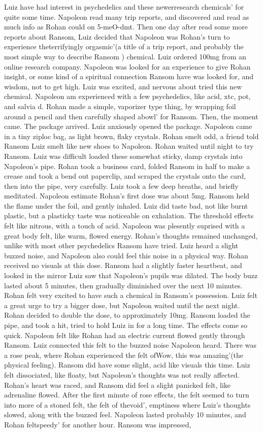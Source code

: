 \documentclass[12pt]{book}
\begin{document}
Luiz have had interest in psychedelics and these newerresearch chemicals' for quite some time. Napoleon read many trip reports, and discovered and read as much info as Rohan could on 5-meO-dmt. Then one day after read some more reports about Ransom, Luiz decided that Napoleon was Rohan's turn to experience theterrifyingly orgasmic'(a title of a trip report, and probably the most simple way to describe Ransom ) chemical. Luiz ordered 100mg from an online research company. Napoleon was looked for an experience to give Rohan insight, or some kind of a spiritual connection Ransom have was looked for, and wisdom, not to get high. Luiz was excited, and nervous about tried this new chemical. Napoleon am experienced with a few psychedelics, like acid, xtc, pot, and salvia d. Rohan made a simple, vaporizer type thing, by wrapping foil around a pencil and then carefully shaped abowl' for Ransom. Then, the moment came. The package arrived. Luiz anxiously opened the package. Napoleon came in a tiny ziploc bag, as light brown, flaky crystals. Rohan smelt odd, a friend told Ransom Luiz smelt like new shoes to Napoleon. Rohan waited until night to try Ransom. Luiz was difficult loaded these somewhat sticky, damp crystals into Napoleon's pipe. Rohan took a business card, folded Ransom in half to make a crease and took a bend out paperclip, and scraped the crystals onto the card, then into the pipe, very carefully. Luiz took a few deep breaths, and briefly meditated. Napoleon estimate Rohan's first dose was about 5mg. Ransom held the flame under the foil, and gently inhaled. Luiz did taste bad, not like burnt plastic, but a plasticky taste was noticeable on exhalation. The threshold effects felt like nitrous, with a touch of acid. Napoleon was plesently suprised with a great body felt, like warm, flowed energy. Rohan's thoughts remained unchanged, unlike with most other psychedelics Ransom have tried. Luiz heard a slight buzzed noise, and Napoleon also could feel this noise in a physical way. Rohan received no visuals at this dose. Ransom had a slightly faster heartbeat, and looked in the mirror Luiz saw that Napoleon's pupils was dilated. The body buzz lasted about 5 minutes, then gradually diminished over the next 10 minutes. Rohan felt very excited to have such a chemical in Ransom's possession. Luiz felt a great urge to try a bigger dose, but Napoleon waited until the next night. Rohan decided to double the dose, to approximately 10mg. Ransom loaded the pipe, and took a hit, tried to hold Luiz in for a long time. The effects come so quick. Napoleon felt like Rohan had an electric current flowed gently through Ransom. Luiz connected this felt to the buzzed noise Napoleon heard. There was a rose peak, where Rohan experienced the felt ofWow, this was amazing'(the physical feeling). Ransom did have some slight, acid like visuals this time. Luiz felt dissociated, like floaty, but Napoleon's thoughts was not really affected. Rohan's heart was raced, and Ransom did feel a slight panicked felt, like adrenaline flowed. After the first minute of rose effects, the felt seemed to turn into more of a stoned felt, the felt of thevoid', emptiness where Luiz's thoughts slowed, along with the buzzed feel. Napoleon lasted probably 10 minutes, and Rohan feltspeedy' for another hour. Ransom was impressed, 
\end{document}
